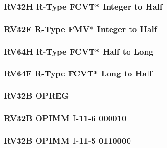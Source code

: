 \subsubsection[{\small RV32H R-Type FCVT* Integer to Half}]{RV32H R-Type FCVT* Integer to Half} \label{sec:format-RV32H-RTypeFCI2D}



\subsubsection[{\small RV32F R-Type FMV* Integer to Half}]{RV32F R-Type FMV* Integer to Half} \label{sec:format-RV32H-RTypeFMI2F}



\subsubsection[{\small RV64H R-Type FCVT* Half to Long}]{RV64H R-Type FCVT* Half to Long} \label{sec:format-RV64H-RTypeFCD2L}



\subsubsection[{\small RV64F R-Type FCVT* Long to Half}]{RV64F R-Type FCVT* Long to Half} \label{sec:format-RV64H-RTypeFCL2H}



\subsubsection[{\small RV32B OPREG}]{RV32B OPREG} \label{sec:format-RV32B-OPREG}



\subsubsection[{\small RV32B OPIMM I-11-6 000010}]{RV32B OPIMM I-11-6 000010} \label{sec:format-RV32B-OPIMM-0x20}



\subsubsection[{\small RV32B OPIMM I-11-5 0110000}]{RV32B OPIMM I-11-5 0110000} \label{sec:format-RV32B-OPIMM-0x30}

